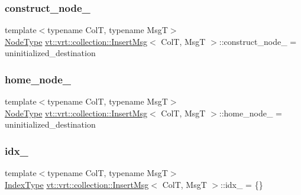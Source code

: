\subsubsection{\texorpdfstring{construct\+\_\+node\+\_\+}{construct\_node\_}}
{\footnotesize\ttfamily template$<$typename ColT, typename MsgT$>$ \\
\hyperlink{namespacevt_a866da9d0efc19c0a1ce79e9e492f47e2}{Node\+Type} \hyperlink{structvt_1_1vrt_1_1collection_1_1_insert_msg}{vt\+::vrt\+::collection\+::\+Insert\+Msg}$<$ ColT, MsgT $>$\+::construct\+\_\+node\+\_\+ = uninitialized\+\_\+destination}

\mbox{\label{structvt_1_1vrt_1_1collection_1_1_insert_msg_a8ce98733c640a3fdfe5a1870f6945040}} 
\subsubsection{\texorpdfstring{home\+\_\+node\+\_\+}{home\_node\_}}
{\footnotesize\ttfamily template$<$typename ColT, typename MsgT$>$ \\
\hyperlink{namespacevt_a866da9d0efc19c0a1ce79e9e492f47e2}{Node\+Type} \hyperlink{structvt_1_1vrt_1_1collection_1_1_insert_msg}{vt\+::vrt\+::collection\+::\+Insert\+Msg}$<$ ColT, MsgT $>$\+::home\+\_\+node\+\_\+ = uninitialized\+\_\+destination}

\mbox{\label{structvt_1_1vrt_1_1collection_1_1_insert_msg_aa694e0805d2e5b253d18c9430fa74ae5}} 
\subsubsection{\texorpdfstring{idx\+\_\+}{idx\_}}
{\footnotesize\ttfamily template$<$typename ColT, typename MsgT$>$ \\
\hyperlink{structvt_1_1vrt_1_1collection_1_1_insert_msg_a6d0f0e849ba09859a0cda3e4785de16b}{Index\+Type} \hyperlink{structvt_1_1vrt_1_1collection_1_1_insert_msg}{vt\+::vrt\+::collection\+::\+Insert\+Msg}$<$ ColT, MsgT $>$\+::idx\+\_\+ = \{\}}

